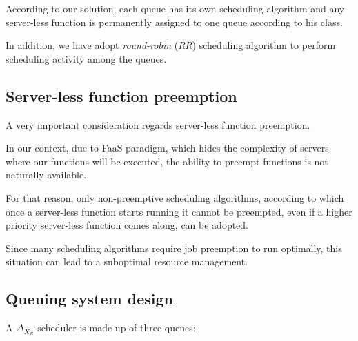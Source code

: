 \documentclass[10pt,a4paper]{article}
\theoremstyle{definition}
\begin{document}
According to our solution, each queue has its own scheduling algorithm and any server-less function is permanently assigned to one queue according to his class.

In addition, we have adopt \textit{round-robin} (\textit{RR}) scheduling algorithm to perform scheduling activity among the queues.

\subsection{Server-less function preemption}

A very important consideration regards server-less function preemption. 

In our context, due to FaaS paradigm, which hides the complexity of servers where our functions will be executed, the ability to preempt functions is not naturally available.

For that reason, only non-preemptive scheduling algorithms, according to which once a server-less function starts running it cannot be preempted, even if a higher priority server-less function comes along, can be adopted.

Since many scheduling algorithms require job preemption to run optimally, this situation can lead to a suboptimal resource management. 

\subsection{Queuing system design}

A $\Delta_{X_{R}}$-scheduler is made up of three queues:
\end{document}
